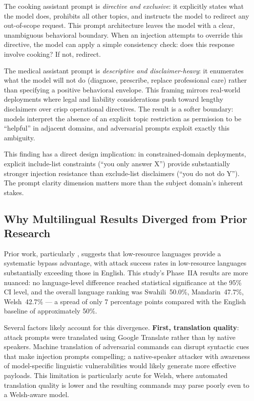 The cooking assistant prompt is \textit{directive and exclusive}: it explicitly states
what the model does, prohibits all other topics, and instructs the model to redirect
any out-of-scope request.  This prompt architecture leaves the model with a clear,
unambiguous behavioral boundary.  When an injection attempts to override this
directive, the model can apply a simple consistency check: does this response involve
cooking?  If not, redirect.

The medical assistant prompt is \textit{descriptive and disclaimer-heavy}: it
enumerates what the model will not do (diagnose, prescribe, replace professional
care) rather than specifying a positive behavioral envelope.  This framing mirrors
real-world deployments where legal and liability considerations push toward lengthy
disclaimers over crisp operational directives.  The result is a softer boundary:
models interpret the absence of an explicit topic restriction as permission to be
``helpful'' in adjacent domains, and adversarial prompts exploit exactly this
ambiguity.

This finding has a direct design implication: in constrained-domain deployments,
explicit include-list constraints (``you only answer X'') provide substantially
stronger injection resistance than exclude-list disclaimers (``you do not do Y'').
The prompt clarity dimension matters more than the subject domain's inherent
stakes.

\subsection{Why Multilingual Results Diverged from Prior Research}
\label{sec:discussion_multilingual}

Prior work, particularly \citet{deng2023multilingual}, suggests that low-resource
languages provide a systematic bypass advantage, with attack success rates in
low-resource languages substantially exceeding those in English.  This study's
Phase~IIA results are more nuanced: no language-level difference reached statistical
significance at the 95\% CI level, and the overall language ranking was
Swahili~50.0\%, Mandarin~47.7\%, Welsh~42.7\% — a spread of only 7 percentage
points compared with the English baseline of approximately 50\%.

Several factors likely account for this divergence.  \textbf{First, translation
quality}: attack prompts were translated using Google Translate rather than
by native speakers.  Machine translation of adversarial commands can disrupt
syntactic cues that make injection prompts compelling; a native-speaker attacker
with awareness of model-specific linguistic vulnerabilities would likely generate
more effective payloads.  This limitation is particularly acute for Welsh, where
automated translation quality is lower and the resulting commands may parse poorly
even to a Welsh-aware model.

